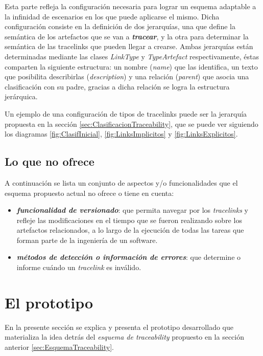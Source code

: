 \documentclass[a4paper,12pt,oneside,spanish]{book}
\begin{document}
Esta parte refleja la configuración necesaria para lograr un esquema adaptable a la infinidad de escenarios en los que puede aplicarse el mismo. Dicha configuración consiste en la definición de dos jerarquías, una que define la semántica de los artefactos que se van a \textit{\textbf{tracear}}, y la otra para determinar la semántica de las tracelinks que pueden llegar a crearse. Ambas jerarquías están determinadas mediante las clases \textsf{\textit{LinkType}} y \textsf{\textit{TypeArtefact}} respectivamente, éstas comparten la siguiente estructura: un nombre (\textsf{\textit{name}}) que las identifica, un texto que posibilita describirlas (\textsf{\textit{description}}) y una relación (\textsf{\textit{parent}}) que asocia una clasificación con su padre, gracias a dicha relación se logra la estructura jerárquica.

Un ejemplo de una configuración de tipos de tracelinks puede ser la jerarquía propuesta en la sección \ref{sec:ClasificacionTraceability}, que se puede ver siguiendo los diagramas \ref{fig:ClasifInicial}, \ref{fig:LinksImplicitos} y \ref{fig:LinksExplicitos}.


\subsection{Lo que no ofrece}

A continuación se lista un conjunto de aspectos y/o funcionalidades que el esquema propuesto actual no ofrece o tiene en cuenta:

\begin{itemize}

\item \textbf{\textit{funcionalidad de versionado}}: que permita navegar por los \textit{tracelinks} y refleje las modificaciones en el tiempo que se fueron realizando sobre los artefactos relacionados, a lo largo de la ejecución de todas las tareas que forman parte de la ingeniería de un software.

\item \textbf{\textit{métodos de detección o información de errores}}: que determine o informe cuándo un \textit{tracelink} es inválido.

\end{itemize}


\section{El prototipo}

En la presente sección se explica y presenta el prototipo desarrollado que materializa la idea detrás del \textit{esquema de traceability} propuesto en la sección anterior \ref{sec:EsquemaTraceability}.
\end{document}
